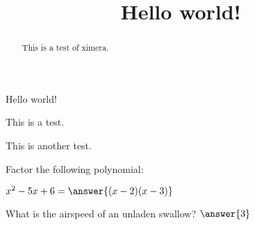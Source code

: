 \documentclass{ximera}
\begin{document}
\title{Hello world!}

\begin{abstract}
This is a test of ximera.
\end{abstract}

\maketitle

Hello world!

This is a test.

This is another test.

\begin{exercise}
Factor the following polynomial:

$x^2 - 5x + 6 = \answer{(x-2)(x-3)}$
\end{exercise}

\begin{exercise}
What is the airspeed of an unladen swallow? $\answer{3}$
\end{exercise}
\end{document}
